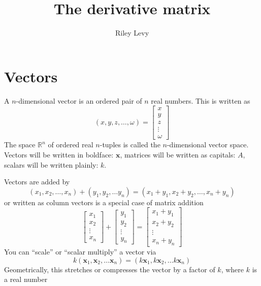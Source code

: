 \documentclass{scrartcl}
\title{\normalfont\sffamily\color{darkgray} The derivative matrix}
\author{Riley Levy}
\providecommand{\R}{\mathbb{R}}
\renewcommand{\vec}{\mathbold}
\begin{document}
\maketitle
\section{Vectors}
A $n$-dimensional vector is an ordered pair of $n$ real numbers. This is written
as
\[
  (x,y,z,\dots,\omega)=
  \begin{bmatrix}
    x \\ y \\ z \\ \vdots \\ \omega
  \end{bmatrix}
\]
The space $\R^n$ of ordered real $n$-tuples is called the $n$-dimensional vector space.
Vectors will be written in boldface: $\vec x$, matrices will be written as
capitals: $A$, scalars will be written plainly: $k$.

Vectors are added by
\[
  (x_1,x_2,\dots,x_n)+(y_1,y_2,\dots y_n) = (x_1+y_1, x_2+y_2, \dots, x_n+y_n)
\]
or written as column vectors is a special case of matrix addition
\[
  \begin{bmatrix}x_1 \\ x_2 \\ \vdots \\ x_n\end{bmatrix}+
  \begin{bmatrix}
    y_1 \\ y_2 \\ \vdots \\y_n
  \end{bmatrix}
  =
  \begin{bmatrix}
    x_1+y_1 \\ x_2+y_2 \\ \vdots \\ x_n+y_n
  \end{bmatrix}
\]
You can ``scale'' or ``scalar multiply'' a vector via
\[
  k(\vec x_1,\vec x_2,\dots \vec x_n)=(k\vec x_1,k\vec x_2,\dots k\vec x_n)
\]
Geometrically, this stretches or compresses the vector by a factor of $k$, where
$k$ is a real number
\end{document}
